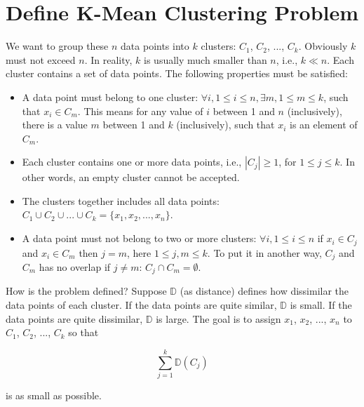 \section{Define K-Mean Clustering Problem}

We want to group these $n$ data points into $k$ clusters: $C_1$,
$C_2$, ..., $C_k$. Obviously $k$ must not exceed $n$. In reality, $k$
is usually much smaller than $n$, i.e., $k \ll n$.  Each cluster
contains a set of data points.   The following properties must be satisfied:

\begin{itemize}
\item A data point must belong to one cluster: $\forall i, 1 \le i \le
  n, \exists m, 1 \le m \le k$, such that $x_i \in C_m$. This means
  for any value of $i$ between 1 and $n$ (inclusively), there is a
  value $m$ between 1 and $k$ (inclusively), such that $x_i$ is an
  element of $C_m$.

  
\item Each cluster contains one or more data points, i.e.,
  $|C_j| \ge 1$, for $1 \le j \le k$.  In other words, an
  empty cluster cannot be accepted.
  
\item The clusters together includes all data points: $C_1 \cup C_2
  \cup ... \cup C_k = \{x_1, x_2, ..., x_n\}$.

\item A data point must not belong to two or more clusters: $\forall
  i, 1 \le i \le n$ if $x_i \in C_j$ and $x_i \in C_m$ then $j = m$,
  here $1 \le j, m \le k$.  To put it in another way, $C_j$ and $C_m$
  has no overlap if $j \ne m$: $C_j \cap C_m = \emptyset$.
  
\end{itemize}

How is the problem defined? Suppose $\mathds{D}$ (as distance) defines
how dissimilar the data points of each cluster.  If the data points
are quite similar, $\mathds{D}$ is small.  If the data points are
quite dissimilar, $\mathds{D}$ is large.  The goal is to assign $x_1$,
$x_2$, ..., $x_n$ to $C_1$, $C_2$, ..., $C_k$ so that

\begin{equation}
  \underset{j = 1}{\overset{k}{\sum}} \mathds{D}(C_j)
  \label{eqn:kmeancost1}
\end{equation}

is as small as possible.

